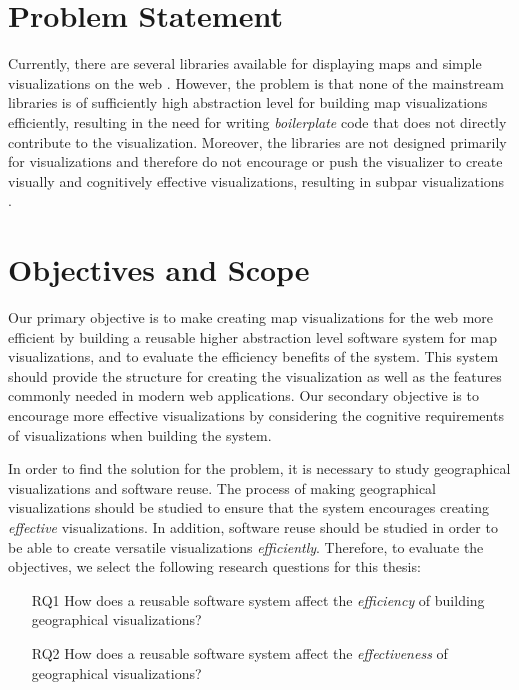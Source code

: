\section{Problem Statement}

Currently, there are several libraries available for displaying maps and simple visualizations on the web \citep{google_maps_2005,agafonkin_leaflet_2011,metacarta_openlayers_2006}. However, the problem is that none of the mainstream libraries is of sufficiently high abstraction level for building map visualizations efficiently, resulting in the need for writing \emph{boilerplate} code that does not directly contribute to the visualization. Moreover, the libraries are not designed primarily for visualizations and therefore do not encourage or push the visualizer to create visually and cognitively effective visualizations, resulting in subpar visualizations \citep[chap.~1]{slocum_thematic_2014}.

\section{Objectives and Scope}

Our primary objective is to make creating map visualizations for the web more efficient by building a reusable higher abstraction level software system for map visualizations, and to evaluate the efficiency benefits of the system. This system should provide the structure for creating the visualization as well as the features commonly needed in modern web applications. Our secondary objective is to encourage more effective visualizations by considering the cognitive requirements of visualizations when building the system.

In order to find the solution for the problem, it is necessary to study geographical visualizations and software reuse. The process of making geographical visualizations should be studied to ensure that the system encourages creating \emph{effective} visualizations. In addition, software reuse should be studied in order to be able to create versatile visualizations \emph{efficiently}. Therefore, to evaluate the objectives, we select the following research questions for this thesis:

\begin{enumerate}
	\item[RQ1] How does a reusable software system affect the \emph{efficiency} of building geographical visualizations?
	\item[RQ2] How does a reusable software system affect the \emph{effectiveness} of geographical visualizations?
\end{enumerate}

